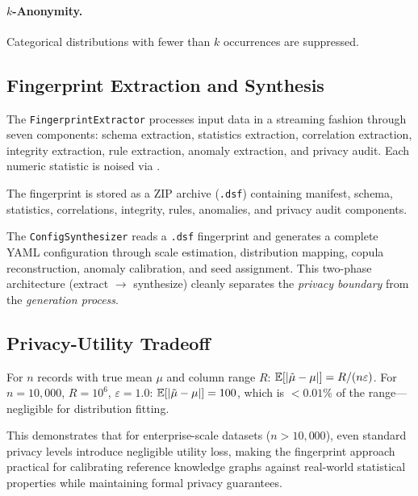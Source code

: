 \paragraph{$k$-Anonymity.}
Categorical distributions with fewer than $k$ occurrences are suppressed.

\subsection{Fingerprint Extraction and Synthesis}
\label{sec:priv_extraction}

The \texttt{FingerprintExtractor} processes input data in a streaming
fashion through seven components: schema extraction, statistics
extraction, correlation extraction, integrity extraction, rule
extraction, anomaly extraction, and privacy audit.  Each numeric
statistic is noised via .

The fingerprint is stored as a ZIP archive (\texttt{.dsf}) containing
manifest, schema, statistics, correlations, integrity, rules, anomalies,
and privacy audit components.

The \texttt{ConfigSynthesizer} reads a \texttt{.dsf} fingerprint and
generates a complete \system{} YAML configuration through scale
estimation, distribution mapping, copula reconstruction, anomaly
calibration, and seed assignment.  This two-phase architecture
(extract $\to$ synthesize) cleanly separates the \emph{privacy boundary}
from the \emph{generation process}.

\subsection{Privacy-Utility Tradeoff}
\label{sec:priv_tradeoff}

\begin{proposition}
\label{prop:utility}
For $n$ records with true mean $\mu$ and column range $R$:
$\mathbb{E}[|\tilde{\mu} - \mu|] = R/(n\varepsilon)$.
For $n = 10{,}000$, $R = 10^6$, $\varepsilon = 1.0$:
$\mathbb{E}[|\tilde{\mu} - \mu|] = 100$, which is $<0.01\%$ of the
range---negligible for distribution fitting.
\end{proposition}

This demonstrates that for enterprise-scale datasets ($n > 10{,}000$),
even standard privacy levels introduce negligible utility loss,
making the fingerprint approach practical for calibrating reference
knowledge graphs against real-world statistical properties while
maintaining formal privacy guarantees.

